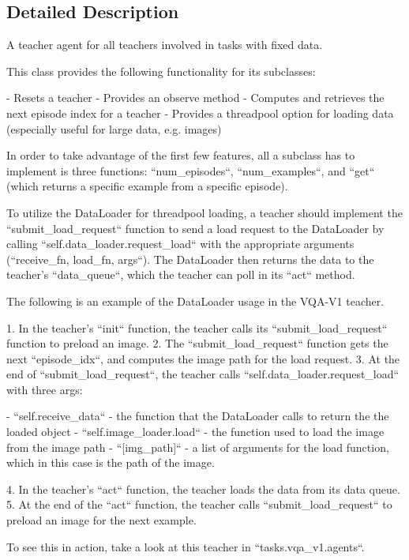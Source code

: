 \subsection{Detailed Description}
\begin{DoxyVerb}A teacher agent for all teachers involved in tasks with fixed data.

This class provides the following functionality for its subclasses:

- Resets a teacher
- Provides an observe method
- Computes and retrieves the next episode index for a teacher
- Provides a threadpool option for loading data (especially useful for
  large data, e.g. images)

In order to take advantage of the first few features, all a subclass has to
implement is three functions: ``num_episodes``, ``num_examples``, and
``get`` (which returns a specific example from a specific episode).

To utilize the DataLoader for threadpool loading, a teacher should
implement the ``submit_load_request`` function to send a load request
to the DataLoader by calling ``self.data_loader.request_load`` with the
appropriate arguments (``receive_fn, load_fn, args``). The DataLoader then
returns the data to the teacher's ``data_queue``, which the teacher can
poll in its ``act`` method.

The following is an example of the DataLoader usage in the VQA-V1 teacher.

1. In the teacher's ``init`` function, the teacher calls its
   ``submit_load_request`` function to preload an image.
2. The ``submit_load_request`` function gets the next ``episode_idx``,
   and computes the image path for the load request.
3. At the end of ``submit_load_request``, the teacher calls
   ``self.data_loader.request_load`` with three args:

    - ``self.receive_data`` - the function that the DataLoader calls to
      return the the loaded object
    - ``self.image_loader.load`` - the function used to load the image
      from the image path
    - ``[img_path]`` - a list of arguments for the load function, which
      in this case is the path of the image.

4. In the teacher's ``act`` function, the teacher loads the data from
   its data queue.
5. At the end of the ``act`` function, the teacher calls
   ``submit_load_request`` to preload an image for the next example.

To see this in action, take a look at this teacher in ``tasks.vqa_v1.agents``.
\end{DoxyVerb}
 

